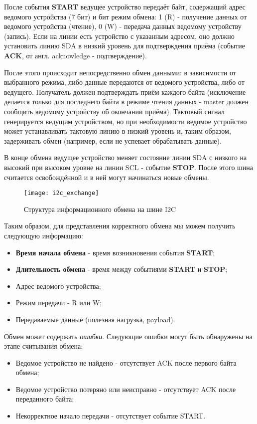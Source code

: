 После события \textbf{START} ведущее устройство передаёт байт, содержащий адрес ведомого устройства (7 бит) и бит режим обмена: 1 (R) - получение данных от ведомого устройства (чтение), 0 (W) - передача данных ведомому устройству (запись). Если на линии есть устройство с указанным адресом, оно должно установить линию SDA в низкий уровень для подтверждения приёма (событие \textbf{ACK}, от англ. acknowledge - подтверждение).

После этого происходит непосредственно обмен данными: в зависимости от выбранного режима, либо данные передаются от ведомого устройства, либо от ведущего. Получатель должен подтверждать приём каждого байта (исключение делается только для последнего байта в режиме чтения данных - master должен сообщить ведомому устройству об окончании приёма). Тактовый сигнал генерируется ведущим устройством, но при необходимости ведомое устройство может устанавливать тактовую линию в низкий уровень и, таким образом, задерживать обмен (например, если не успевает обрабатывать данные).

В конце обмена ведущее устройство меняет состояние линии SDA с низкого на высокий при высоком уровне на линии SCL - событие \textbf{STOP}. После этого шина считается освобождённой и в ней могут начинаться новые обмены.

\begin{figure}[H]
 \centering
 \texttt{[image: i2c\_exchange]}
 \caption{Структура информационного обмена на шине I2C}
 \label{fig:i2c_exchange}
\end{figure}

Таким образом, для представления корректного обмена мы можем получить следующую информацию:

\begin{itemize}
 \item \textbf{Время начала обмена} - время возникновения события \textbf{START};
 \item \textbf{Длительность обмена} - время между событиями \textbf{START} и \textbf{STOP};
 \item Адрес ведомого устройства;
 \item Режим передачи - R или W;
 \item Передаваемые данные (полезная нагрузка, payload).
\end{itemize}

Обмен может содержать \textit{ошибки}. Следующие ошибки могут быть обнаружены на этапе считывания обмена:

\begin{itemize}
 \item Ведомое устройство не найдено - отсутствует ACK после первого байта обмена;
 \item Ведомое устройство потеряно или неисправно - отсутствует ACK после переданного байта;
 \item Некорректное начало передачи - отсутствует событие START.
\end{itemize}





